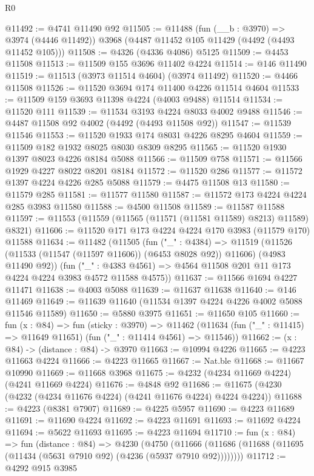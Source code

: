 \begin{lexlean}{R0}
\begin{coremodule}
@11492 := @4741 @11490 @92
@11505 := @11488
    (fun (__b : @3970) => @3974 (@4446 @11492))
    @3968
    (@4487 @11452 @105 @11429 (@4492 (@4493 @11452 @105)))
@11508 := @4326 (@4336 @4086) @5125
@11509 := @4453 @11508
@11513 := @11509 @155 @3696 @11402 @4224
@11514 := @146 @11490
@11519 := @11513 (@3973 @11514 @4604) (@3974 @11492)
@11520 := @4466 @11508
@11526 := @11520 @3694 @174 @11400 @4226 @11514 @4604
@11533 := @11509 @159 @3693 @11398 @4224 (@4003 @9488) @11514
@11534 := @11520 @111
@11539 := @11534 @3193 @4224 @8033 @4002 @9488
@11546 := @4487 @11508 @92 @4002 (@4492 (@4493 @11508 @92))
@11547 := @11539 @11546
@11553 := @11520 @1933 @174 @8031 @4226 @8295 @4604
@11559 := @11509 @182 @1932 @8025 @8030 @8309 @8295
@11565 := @11520 @1930 @1397 @8023 @4226 @8184 @5088
@11566 := @11509 @758
@11571 := @11566 @1929 @4227 @8022 @8201 @8184
@11572 := @11520 @286
@11577 := @11572 @1397 @4224 @4226 @285 @5088
@11579 := @4475 @11508 @13
@11580 := @11579 @285
@11581 := @11577 @11580
@11587 := @11572 @173 @4224 @4224 @285 @3983 @11580
@11588 := @4500 @11508
@11589 := @11587 @11588
@11597 := @11553 (@11559 (@11565 (@11571 (@11581 @11589) @8213) @11589) @8321)
@11606 := @11520 @171 @173 @4224 @4224 @170 @3983 (@11579 @170) @11588
@11634 := @11482
    (@11505
      (fun ("_" : @4384) =>
      @11519 (@11526 (@11533 (@11547 (@11597 @11606)) (@6453 @8028 @92)) @11606) (@4983 @11490 @92))
      (fun ("_" : @4383 @4561) => @4564 @11508 @201 @11 @173 @4224 @4224 @3983 @4572 @11588 @4575))
@11637 := @11566 @1694 @4227 @11471
@11638 := @4003 @5088
@11639 := @11637 @11638
@11640 := @146 @11469
@11649 := @11639 @11640 (@11534 @1397 @4224 @4226 @4002 @5088 @11546 @11589)
@11650 := @5880 @3975
@11651 := @11650 @105
@11660 := fun (x : @84) =>
  fun (sticky : @3970) =>
  @11462 (@11634 (fun ("_" : @11415) => @11649 @11651) (fun ("_" : @11414 @4561) => @11546))
@11662 := (x : @84) -> (distance : @84) -> @3970
@11663 := @10994 @4226
@11665 := @4223 @11663 @4224
@11666 := @4223 @11665
@11667 := Nat.ble
@11668 := @11667 @10990
@11669 := @11668 @3968
@11675 := @4232 (@4234 @11669 @4224) (@4241 @11669 @4224)
@11676 := @4848 @92
@11686 := @11675 (@4230 (@4232 (@4234 @11676 @4224) (@4241 @11676 @4224) @4224 @4224))
@11688 := @4223 (@8381 @7907)
@11689 := @4225 @5957
@11690 := @4223 @11689
@11691 := @11690 @4224
@11692 := @4223 @11691
@11693 := @11692 @4224
@11694 := @5622 @11693
@11695 := @4223 @11694
@11710 := fun (x : @84) =>
  fun (distance : @84) =>
  @4230
    (@4750 (@11666 (@11686 (@11688 (@11695 (@11434 (@5631 @7910 @92) (@4236 (@5937 @7910 @92))))))))
@11712 := @4292 @915 @3985

\end{coremodule}
\end{lexlean}
